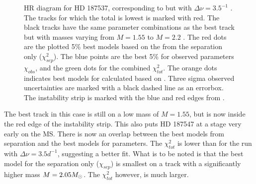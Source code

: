 \begin{figure}[htbp]
	\centering
	\caption{HR diagram for HD 187537, corresponding to  but with $\Delta \nu = 3.5^{-1}$ . The tracks for which the total \chis is lowest is marked with red. The black tracks have the same parameter combinations as the best track but with masses varying from $M=1.55$ to $M=2.2$ \msun. The red dots are the plotted 5\% best models based on the \chis from the separation only ($\chi_{sep}^2$). The blue points are the best 5\% for observed parameters $\chi_{obs}$, and the green dots for the combined $\chi_{tot}^2$. The orange dots indicates best models for \chis calculated based on \lum. Three sigma observed uncertainties are marked with a black dashed line as an errorbox. The instability strip is marked with the blue and red edges from \citet{murphy2019gaia}.}
	\label{finalsuper7}
\end{figure}


The best track in this case is still on a low mass of $M=1.55$\msun, but is now inside the red edge of the instability strip. This also puts HD 187547 at a stage very early on the MS. There is now an overlap between the best models from separation and the best models for parameters. The $\chi_{ tot}^2$ is lower than for the run with $\Delta \nu = 3.5d^{-1}$, suggesting a better fit. What is to be noted is that the best model for the separation only ($\chi_{sep}$) is smallest on a track with a significantly higher mass $M=2.05M_{\odot}$.  The $\chi_{tot}^2$ however, is much larger. 

